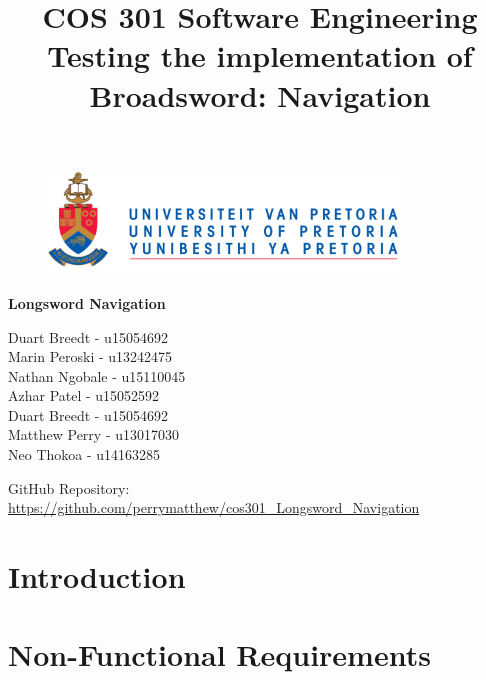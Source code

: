 \documentclass{article}
\begin{document}
		\begin{figure}[t]
			\centering
			\includegraphics[width=350px]{UP_Logo.PNG}
		\end{figure}
			\title{COS 301 Software Engineering\\ Testing the implementation of Broadsword: Navigation}
\maketitle
		\begin{center}
			\textbf{\newline Longsword Navigation} \\
		\end{center}
			
				
		\begin{flushright} \large
			Duart Breedt - u15054692\\			
			Marin Peroski - u13242475\\
			Nathan Ngobale -  u15110045\\
			Azhar Patel - u15052592\\
			Duart Breedt - u15054692\\
			Matthew Perry - u13017030\\
			Neo Thokoa - u14163285\\
		\end{flushright}
		
		
		
		
		GitHub Repository: \href{https://github.com/perrymatthew/cos301_Longsword_Navigation}\\
		\url{https://github.com/perrymatthew/cos301_Longsword_Navigation}
	

\clearpage
\tableofcontents
\clearpage

\section{Introduction}
\clearpage

\section{Non-Functional Requirements}
	
	
\end{document}
